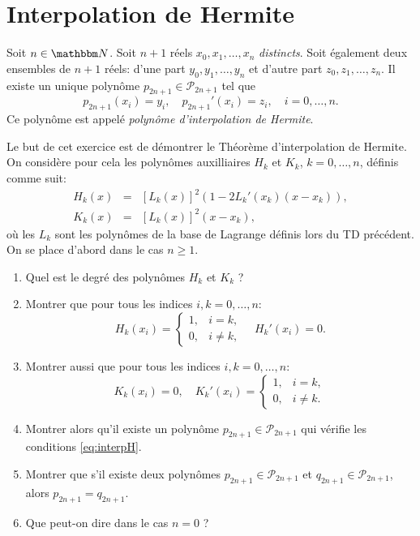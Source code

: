 \newpage

\section{Interpolation de Hermite}

\begin{theorem}
Soit $n\in\eN$. Soit $n+1$ réels $x_0,x_1,\ldots,x_n$ \emph{distincts}. Soit également deux ensembles de $n+1$ réels: d'une part $y_0,y_1,\ldots,y_n$ et d'autre part $z_0,z_1,\ldots,z_n$. Il existe un unique polynôme $p_{2n+1} \in \mathcal{P}_{2n+1}$ tel que
\begin{equation} \label{eq:interpH}
p_{2n+1}(x_i)=y_i,\quad 
p_{2n+1}'(x_i)=z_i,\quad i=0,\ldots,n.
\end{equation}
Ce polynôme est appelé \emph{polynôme d'interpolation de Hermite}.
\end{theorem}

\begin{exercice}

Le but de cet exercice est de démontrer le Théorème d'interpolation de Hermite.
On considère pour cela les polynômes auxilliaires $H_k$ et $K_k$, $k=0,\ldots,n$, définis comme suit:
\begin{eqnarray*}
H_k(x) & = & [L_k(x)]^2 ( 1 - 2 L_k'(x_k)(x-x_k)),\\
K_k(x) & = & [L_k(x)]^2 ( x - x_k ),
\end{eqnarray*}
où les $L_k$ sont les polynômes de la base de Lagrange définis lors du TD précédent.
On se place d'abord dans le cas $n\geq 1$.

\begin{enumerate}

\item Quel est le degré des polynômes $H_k$ et $K_k$ ?

\item Montrer que pour tous les indices $i,k=0,\ldots,n$:
\[
H_k(x_i) = \left \{ \begin{array}{ll} 1,& i=k, \\ 0,&i\neq k, \end{array} \right.
\quad
H_k'(x_i) = 0.
\]
\item Montrer aussi que pour tous les indices $i,k=0,\ldots,n$:
\[
K_k(x_i) = 0,
\quad
K_k'(x_i) = \left \{ \begin{array}{ll} 1,& i=k, \\ 0,&i\neq k. \end{array} \right.
\]

\item Montrer alors qu'il existe un polynôme $p_{2n+1} \in \mathcal{P}_{2n+1}$ qui vérifie les conditions \eqref{eq:interpH}.

\item Montrer que s'il existe deux polynômes $p_{2n+1} \in \mathcal{P}_{2n+1}$ et $q_{2n+1} \in \mathcal{P}_{2n+1}$, alors $p_{2n+1} = q_{2n+1}$.

\item Que peut-on dire dans le cas $n=0$ ?

\end{enumerate}

\end{exercice}

